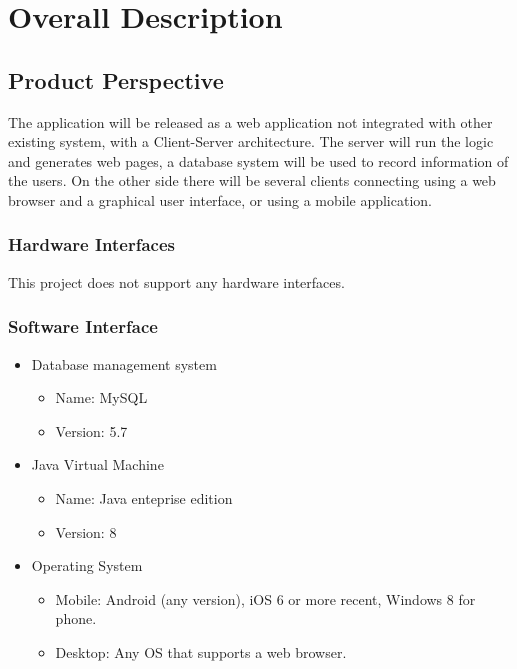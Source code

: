 \section{Overall Description}

\subsection{Product Perspective}
	The application will be released as a web application not integrated with other existing system, with a Client-Server architecture. The server will run the logic and generates web pages, a database system will be used to record information of the users. On the other side there will be several clients connecting using a web browser and a graphical user interface, or using a mobile application.	
	
	\subsubsection{Hardware Interfaces}
	This project does not support any hardware interfaces.
	\subsubsection{Software Interface}
	\begin{itemize}
		\item {Database management system}
			\begin{itemize}
				\item Name: MySQL
				\item Version: 5.7
			\end{itemize}
		\item {Java Virtual Machine}
			\begin{itemize}
				\item Name: Java enteprise edition
				\item Version: 8
			\end{itemize}
		\item {Operating System}
			\begin{itemize}
				\item Mobile: Android (any version), iOS 6 or more recent, Windows 8 for phone.
				\item Desktop: Any OS that supports a web browser.
			\end{itemize}
	\end{itemize}
